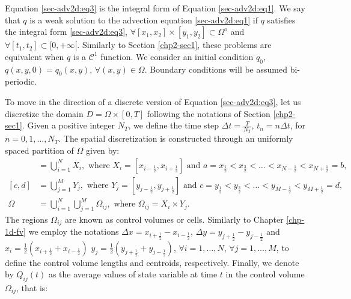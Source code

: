 Equation \eqref{sec-adv2d:eq3} is the integral form of Equation 
\eqref{sec-adv2d:eq1}. We say that ${q}$ is a weak
solution to the advection equation \eqref{sec-adv2d:eq1} if ${q}$
satisfies the integral form \eqref{sec-adv2d:eq3}, 
$\forall [x_1,x_2]\times[y_1,y_2] \subset \Omega^{\mathrm{o}}$ and 
$\forall [t_1,t_2] \subset [0,+\infty[$.
Similarly to Section \ref{chp2-sec1}, these problems are equivalent
when  ${q}$ is a $\mathcal{C}^1$ function.
We consider an initial condition ${q_0}$,
${q}(x,y,0) =  {q_0}(x,y)$, $\forall (x,y) \in \Omega$.
Boundary conditions will be assumed bi-periodic.

To move in the direction of a discrete version of Equation \eqref{sec-adv2d:eq3},
let us discretize the domain $D = \Omega \times [0,T]$ following 
the notations of Section \ref{chp2-sec1}.
Given a positive integer $N_T$, we define the time step 
$\Delta t = \frac{T}{N_T}$, $t_n = n \Delta t$, for $n = 0, 1 ,\ldots, N_T$.
The spatial discretization is constructed through an uniformly spaced partition of $\Omega$ given by:
\begin{align}
	[a,b] &= \bigcup_{i=1}^N X_i, 
	\text{ where } X_i= [x_{i-\frac{1}{2}}, x_{i+\frac{1}{2}}] \text{ and } 
	a = x_{\frac{1}{2}} < x_{\frac{3}{2}} < \ldots < x_{N-\frac{1}{2}} < x_{N+\frac{1}{2}} = b, \\
	[c,d] &= \bigcup_{j=1}^M Y_j, 
\text{ where } Y_j= [y_{j-\frac{1}{2}}, y_{j+\frac{1}{2}}] \text{ and } 
	c = y_{\frac{1}{2}} < y_{\frac{3}{2}} < \ldots < y_{M-\frac{1}{2}} < y_{M+\frac{1}{2}} = d, \\
    \Omega &=  \bigcup_{i=1}^N \bigcup_{j=1}^M \Omega_{ij}, \text{ where } \Omega_{ij} = X_i \times Y_j.
\end{align}
The regions $\Omega_{ij}$ are known as control volumes or cells. 
Similarly to  Chapter \ref{chp-1d-fv} we employ the notations
$\Delta x = x_{i+\frac{1}{2}} - x_{i-\frac{1}{2}}$,
$\Delta y = y_{j+\frac{1}{2}} - y_{j-\frac{1}{2}}$ 
and $x_i = \frac{1}{2}(x_{i+\frac{1}{2}} + x_{i-\frac{1}{2}})$
$y_j = \frac{1}{2}(y_{j+\frac{1}{2}} + y_{j-\frac{1}{2}})$, $\forall i = 1, \ldots, N$, 
$\forall j = 1, \ldots, M$,
to define the control volume lengths and centroids, respectively.
Finally, we denote by ${Q}_{ij}(t)$ as the average values of state variable at time $t$
in the control volume $\Omega_{ij}$, that is:

